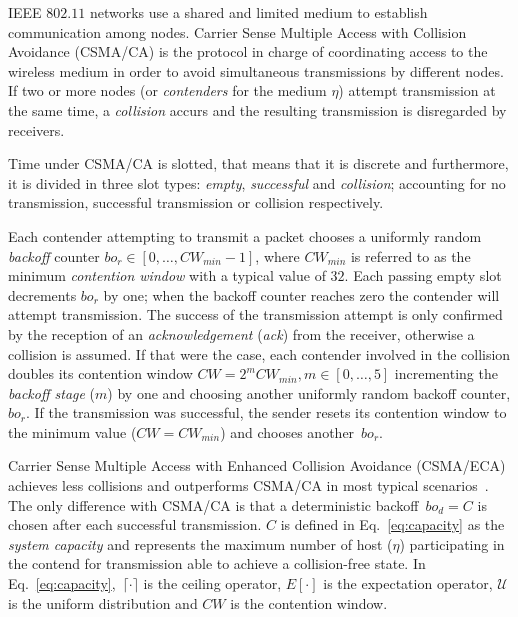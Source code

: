 IEEE $802.11$ networks use a shared and limited medium to establish communication among nodes. Carrier Sense Multiple Access with Collision Avoidance (CSMA/CA) is the protocol in charge of coordinating access to the wireless medium in order to avoid simultaneous transmissions by different nodes. If two or more nodes (or \emph{contenders} for the medium $\eta$) attempt transmission at the same time, a \emph{collision} accurs and the resulting transmission is disregarded by receivers.

Time under CSMA/CA is slotted, that means that it is discrete and furthermore, it is divided in three slot types: \emph{empty}, \emph{successful} and \emph{collision}; accounting for no transmission, successful transmission or collision respectively. 

Each contender attempting to transmit a packet chooses a uniformly random \emph{backoff} counter $bo_{r} \in [0,\ldots,CW_{min}-1]$, where $CW_{min}$ is referred to as the minimum \emph{contention window} with a typical value of $32$. Each passing empty slot decrements $bo_{r}$ by one; when the backoff counter reaches zero the contender will attempt transmission. The success of the transmission attempt is only confirmed by the reception of an \emph{acknowledgement} (\emph{ack}) from the receiver, otherwise a collision is assumed. If that were the case, each contender involved in the collision doubles its contention window $CW = 2^{m}CW_{min}, m\in[0,\ldots,5]$ incrementing the \emph{backoff stage} ($m$) by one and choosing another uniformly random backoff counter, $bo_{r}$. If the transmission was successful, the sender resets its contention window to the minimum value ($CW=CW_{min}$) and chooses another~$bo_{r}$.

Carrier Sense Multiple Access with Enhanced Collision Avoidance (CSMA/ECA) achieves less collisions and outperforms CSMA/CA in most typical scenarios~\cite{CSMA_ECA}. The only difference with CSMA/CA is that a deterministic backoff~$bo_{d} = C$ is chosen after each successful transmission. $C$ is defined in Eq.~\ref{eq:capacity} as the \emph{system capacity} and represents the maximum number of host ($\eta$) participating in the contend for transmission able to achieve a collision-free state. In Eq.~\ref{eq:capacity},~$\lceil{\cdotp}\rceil$ is the ceiling operator, $E[\cdotp]$ is the expectation operator, $\mathcal{U}$ is the uniform distribution and $CW$ is the contention window.


